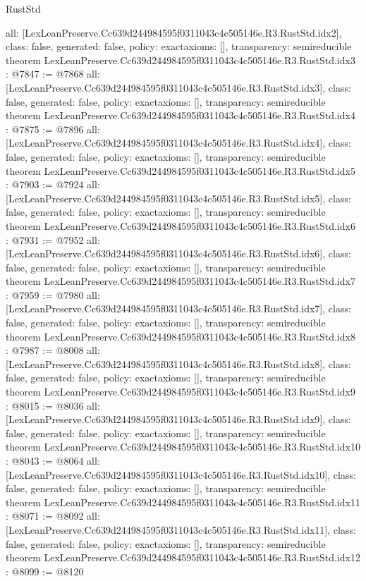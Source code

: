 \begin{lexlean}{RustStd}
\begin{coremodule}
{  all: [LexLeanPreserve.Cc639d244984595f0311043c4c505146e.R3.RustStd.idx2],
  class: false,
  generated: false,
  policy: exact{axioms: []},
  transparency: semireducible
}
theorem LexLeanPreserve.Cc639d244984595f0311043c4c505146e.R3.RustStd.idx3 : @7847 := @7868 {
  all: [LexLeanPreserve.Cc639d244984595f0311043c4c505146e.R3.RustStd.idx3],
  class: false,
  generated: false,
  policy: exact{axioms: []},
  transparency: semireducible
}
theorem LexLeanPreserve.Cc639d244984595f0311043c4c505146e.R3.RustStd.idx4 : @7875 := @7896 {
  all: [LexLeanPreserve.Cc639d244984595f0311043c4c505146e.R3.RustStd.idx4],
  class: false,
  generated: false,
  policy: exact{axioms: []},
  transparency: semireducible
}
theorem LexLeanPreserve.Cc639d244984595f0311043c4c505146e.R3.RustStd.idx5 : @7903 := @7924 {
  all: [LexLeanPreserve.Cc639d244984595f0311043c4c505146e.R3.RustStd.idx5],
  class: false,
  generated: false,
  policy: exact{axioms: []},
  transparency: semireducible
}
theorem LexLeanPreserve.Cc639d244984595f0311043c4c505146e.R3.RustStd.idx6 : @7931 := @7952 {
  all: [LexLeanPreserve.Cc639d244984595f0311043c4c505146e.R3.RustStd.idx6],
  class: false,
  generated: false,
  policy: exact{axioms: []},
  transparency: semireducible
}
theorem LexLeanPreserve.Cc639d244984595f0311043c4c505146e.R3.RustStd.idx7 : @7959 := @7980 {
  all: [LexLeanPreserve.Cc639d244984595f0311043c4c505146e.R3.RustStd.idx7],
  class: false,
  generated: false,
  policy: exact{axioms: []},
  transparency: semireducible
}
theorem LexLeanPreserve.Cc639d244984595f0311043c4c505146e.R3.RustStd.idx8 : @7987 := @8008 {
  all: [LexLeanPreserve.Cc639d244984595f0311043c4c505146e.R3.RustStd.idx8],
  class: false,
  generated: false,
  policy: exact{axioms: []},
  transparency: semireducible
}
theorem LexLeanPreserve.Cc639d244984595f0311043c4c505146e.R3.RustStd.idx9 : @8015 := @8036 {
  all: [LexLeanPreserve.Cc639d244984595f0311043c4c505146e.R3.RustStd.idx9],
  class: false,
  generated: false,
  policy: exact{axioms: []},
  transparency: semireducible
}
theorem LexLeanPreserve.Cc639d244984595f0311043c4c505146e.R3.RustStd.idx10 : @8043 := @8064 {
  all: [LexLeanPreserve.Cc639d244984595f0311043c4c505146e.R3.RustStd.idx10],
  class: false,
  generated: false,
  policy: exact{axioms: []},
  transparency: semireducible
}
theorem LexLeanPreserve.Cc639d244984595f0311043c4c505146e.R3.RustStd.idx11 : @8071 := @8092 {
  all: [LexLeanPreserve.Cc639d244984595f0311043c4c505146e.R3.RustStd.idx11],
  class: false,
  generated: false,
  policy: exact{axioms: []},
  transparency: semireducible
}
theorem LexLeanPreserve.Cc639d244984595f0311043c4c505146e.R3.RustStd.idx12 : @8099 := @8120 {
}
\end{coremodule}
\end{lexlean}
